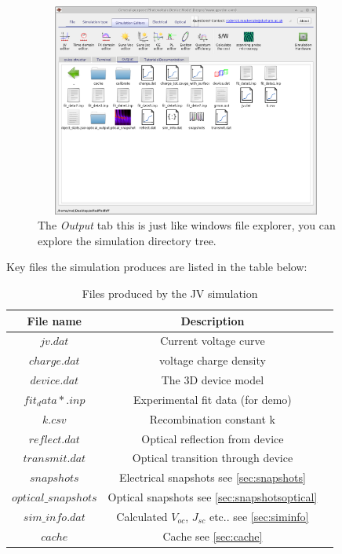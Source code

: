 \begin{figure}[H]
\centering
\includegraphics[width=100mm,height=70mm]{./images/output.png}
\caption{The \emph{Output} tab this is just like windows file explorer, you can explore the simulation directory tree.}
\label{fig:output}
\end{figure}

Key files the simulation produces are listed in the table below:

\begin{table}[H]
\begin{center}
\begin{tabular}{ |c|c|c| } 
 \hline
	File name 			& 	Description  \\ 
 \hline
	$jv.dat$ 			&	Current voltage curve \\ 
	$charge.dat$ 		&	voltage charge density\\ 
	$device.dat$ 		&	The 3D device model\\ 
	$fit_data*.inp$ 	&	Experimental fit data (for demo)\\
	$k.csv$ 			&	Recombination constant k\\ 
	$reflect.dat$ 		&	Optical reflection from device\\ 
	$transmit.dat$ 		&	Optical transition through device\\ 
	$snapshots$ 		&	Electrical snapshots see \ref{sec:snapshots}\\
	$optical\_snapshots$&	Optical snapshots see \ref{sec:snapshotsoptical} \\
	$sim\_info.dat$ 	&	Calculated $V_{oc}$, $J_{sc}$ etc.. see \ref{sec:siminfo}   \\
	$cache$ 			&	Cache see \ref{sec:cache}  \\
 \hline
\end{tabular}
\caption{Files produced by the JV simulation}
\label{fig:output}
\end{center}
\end{table}

